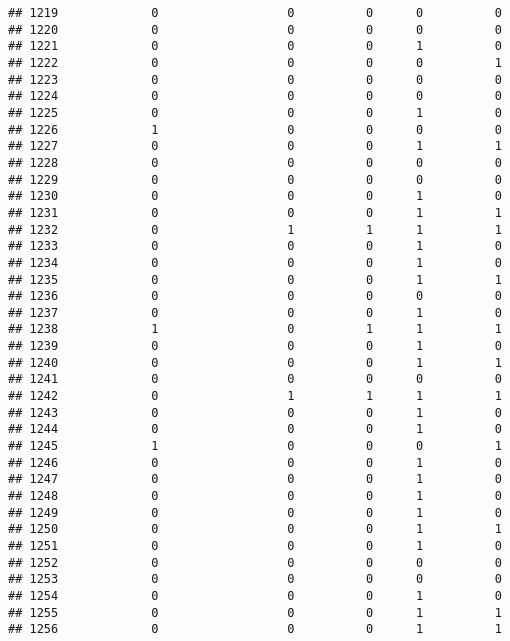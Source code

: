 \documentclass[
]{article}
\begin{document}
\begin{verbatim}
## 1219             0                  0          0      0          0
## 1220             0                  0          0      0          0
## 1221             0                  0          0      1          0
## 1222             0                  0          0      0          1
## 1223             0                  0          0      0          0
## 1224             0                  0          0      0          0
## 1225             0                  0          0      1          0
## 1226             1                  0          0      0          0
## 1227             0                  0          0      1          1
## 1228             0                  0          0      0          0
## 1229             0                  0          0      0          0
## 1230             0                  0          0      1          0
## 1231             0                  0          0      1          1
## 1232             0                  1          1      1          1
## 1233             0                  0          0      1          0
## 1234             0                  0          0      1          0
## 1235             0                  0          0      1          1
## 1236             0                  0          0      0          0
## 1237             0                  0          0      1          0
## 1238             1                  0          1      1          1
## 1239             0                  0          0      1          0
## 1240             0                  0          0      1          1
## 1241             0                  0          0      0          0
## 1242             0                  1          1      1          1
## 1243             0                  0          0      1          0
## 1244             0                  0          0      1          0
## 1245             1                  0          0      0          1
## 1246             0                  0          0      1          0
## 1247             0                  0          0      1          0
## 1248             0                  0          0      1          0
## 1249             0                  0          0      1          0
## 1250             0                  0          0      1          1
## 1251             0                  0          0      1          0
## 1252             0                  0          0      0          0
## 1253             0                  0          0      0          0
## 1254             0                  0          0      1          0
## 1255             0                  0          0      1          1
## 1256             0                  0          0      1          1

\end{verbatim}
\end{document}
